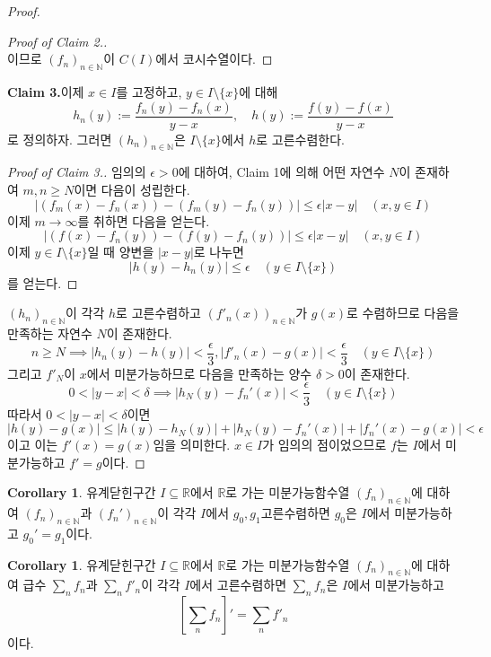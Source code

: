 \documentclass[11pt]{book}
\numberwithin{equation}{chapter}
\def\NN{\mathbb{N}}
\def\RR{\mathbb{R}}
\def\eps{\epsilon}
\newcommand{\abs}[1]{\left\vert#1\right\vert}
\newcommand{\sqbracket}[1]{\left[#1\right]}
\theoremstyle{definition}
\newtheorem{cor}[thm]{Corollary}
\begin{document}
\begin{proof}
\begin{proof}[Proof of Claim 2.]
\[        \]
        이므로 \((f_n)_{n \in \NN}\)이 \(C(I)\)에서 코시수열이다.
    \end{proof}
    \noindent\textbf{Claim 3.}이제 \(x \in I\)를 고정하고, \(y \in I \setminus \{x\}\)에 대해
    \[
    h_n(y) := \frac{f_n(y) - f_n(x)}{y-x}, \quad h(y) := \frac{f(y) - f(x)}{y - x}    
    \]
    로 정의하자. 그러면 \((h_n)_{n \in \NN}\)은 \(I \setminus \{x\}\)에서 \(h\)로 고른수렴한다.
    \begin{proof}[Proof of Claim 3.]
        임의의 \(\eps > 0\)에 대하여, Claim 1에 의해 어떤 자연수 \(N\)이 존재하여 \(m, n \ge N\)이면 다음이 성립한다.
        \[
         \abs{(f_m(x) - f_n(x)) - (f_m(y) - f_n(y))} \le \eps \abs{x - y} \quad (x, y \in I)
        \]
        이제 \(m \to \infty\)를 취하면 다음을 얻는다.
        \[
        \abs{(f(x) - f_n(y)) - (f(y) - f_n(y))} \le \eps \abs{x - y} \quad (x, y \in I)  
        \]
        이제 \(y \in I \setminus \{x\}\)일 때 양변을 \(\abs{x - y}\)로 나누면
        \[
        \abs{h(y) - h_n(y)} \le \eps \quad (y \in I \setminus \{x\})    
        \]
        를 얻는다.
    \end{proof}
    \noindent\((h_n)_{n \in \NN}\)이 각각 \(h\)로 고른수렴하고 \((f'_n(x))_{n \in \NN}\)가 \(g(x)\)로 수렴하므로 다음을 만족하는 자연수 \(N\)이 존재한다.
    \[
        n \ge N \implies \abs{h_n(y) - h(y)} < \frac{\eps}{3}, \abs{f'_n(x) - g(x)} < \frac{\eps}{3} \quad (y \in I \setminus \{x\})
    \]
    그리고 \(f'_N\)이 \(x\)에서 미분가능하므로 다음을 만족하는 양수 \(\delta > 0\)이 존재한다.
    \[
    0 < \abs{y - x} < \delta \implies \abs{h_N(y) - f_n'(x)} < \frac{\eps}{3} \quad (y \in I \setminus \{x\})
    \]
    따라서 \(0 < \abs{y - x} < \delta\)이면
    \[
        \abs{h(y) - g(x)} \le \abs{h(y) - h_N(y)} + \abs{h_N(y) - f_n'(x)} + \abs{f_n'(x) - g(x)} < \eps
    \]
    이고 이는 \(f'(x) = g(x)\)임을 의미한다. \(x \in I\)가 임의의 점이었으므로 \(f\)는 \(I\)에서 미분가능하고 \(f' = g\)이다.
\end{proof}

\begin{cor} \label{12.1.2}
    유계닫힌구간 \(I \subseteq \RR\)에서 \(\RR\)로 가는 미분가능함수열 \((f_n)_{n \in \NN}\)에 대하여 \((f_n)_{n \in \NN}\)과 \((f_n')_{n \in \NN}\)이 각각 \(I\)에서 \(g_0, g_1\)고른수렴하면 \(g_0\)은 \(I\)에서 미분가능하고 \(g_0' = g_1\)이다.
\end{cor}

\begin{cor}
    유계닫힌구간  \(I \subseteq \RR\)에서 \(\RR\)로 가는 미분가능함수열 \((f_n)_{n \in \NN}\)에 대하여 급수 \(\sum_n f_n\)과 \(\sum_n f'_n\)이 각각 \(I\)에서 고른수렴하면 \(\sum_n f_n\)은 \(I\)에서 미분가능하고
    \[
    \sqbracket{\sum_n f_n}' = \sum_n f'_n    
    \]
    이다.
\end{cor}
\end{document}
